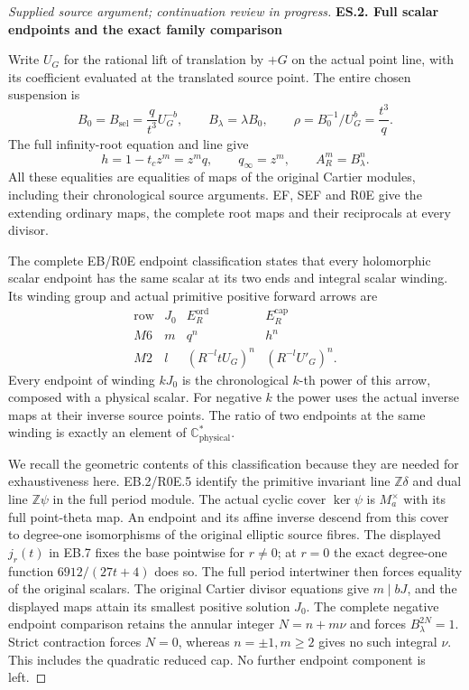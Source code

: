 \begin{proof}[Supplied source argument; continuation review in progress]
\par

\medskip\noindent\textbf{ES.2. Full scalar endpoints and the exact family comparison}

\par\nobreak

Write \(U_G\) for the rational lift of translation by \(+G\) on
the actual point line, with its coefficient evaluated at the
translated source point. The entire chosen suspension is
\[
 B_0=B_{\mathrm{sel}}=\frac{q}{t^3}U_G^{-b},
 \qquad B_\lambda=\lambda B_0,\qquad
 \rho=B_0^{-1}/U_G^b=\frac{t^3}{q}.
 \tag{ES.9}
\]
The full infinity-root equation and line give
\[
 h=1-t_cz^m=z^mq,\qquad q_\infty=z^m,\qquad
 A_R^m=B_\lambda^n .
 \tag{ES.10}
\]
All these equalities are equalities of maps of the original
Cartier modules, including their chronological source arguments.
EF, SEF and R0E give the extending ordinary maps, the complete
root maps and their reciprocals at every divisor.

The complete EB/R0E endpoint classification states that every
holomorphic scalar endpoint has the same scalar at its two
ends and integral scalar winding. Its winding group and actual
primitive positive forward arrows are
\[
 \begin{array}{c|c|c|c}
 \text{row}&J_0& E_R^{\mathrm{ord}}&E_R^{\mathrm{cap}}\\ \hline
 M6&m&q^n&h^n\\
 M2&l&(R^{-l}tU_G)^n&(R^{-l}U'_G)^n .
 \end{array}
 \tag{ES.11}
\]
Every endpoint of winding \(kJ_0\) is the chronological \(k\)-th
power of this arrow, composed with a physical scalar.
For negative \(k\) the power uses the actual inverse maps at
their inverse source points. The ratio of two endpoints at
the same winding is exactly an element of
\(\mathbb C^*_{\mathrm{physical}}\).

We recall the geometric contents of this classification because
they are needed for exhaustiveness here. EB.2/R0E.5 identify the
primitive invariant line \(\mathbb Z\delta\) and dual line
\(\mathbb Z\psi\) in the full period module. The actual cyclic
cover \(\ker\psi\) is \(M_a^\times\) with its full point-theta
map. An endpoint and its affine inverse descend from this cover
to degree-one isomorphisms of the original elliptic source
fibres. The displayed \(j_r(t)\) in EB.7 fixes the base
pointwise for \(r\ne0\); at \(r=0\) the exact degree-one
function \(6912/(27t+4)\) does so. The full period intertwiner
then forces equality of the original scalars. The original
Cartier divisor equations give \(m\mid bJ\), and the displayed
maps attain its smallest positive solution \(J_0\).
The complete negative endpoint comparison retains the annular
integer \(N=n+m\nu\) and forces \(B_\lambda^{2N}=1\).
Strict contraction forces \(N=0\), whereas \(n=\pm1,m\ge2\)
gives no such integral \(\nu\). This includes the quadratic
reduced cap. No further endpoint component is left.


\end{proof}
